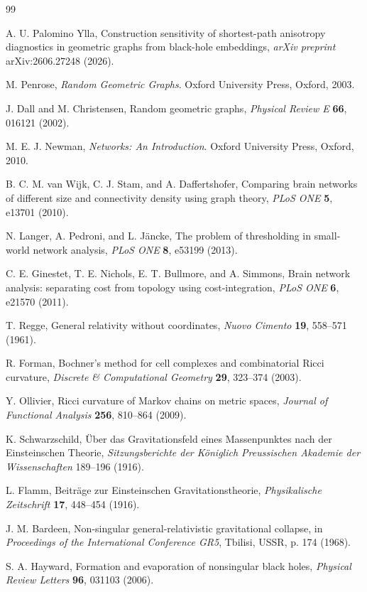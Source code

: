 \documentclass[11pt]{article}
\begin{document}
\begin{thebibliography}{99}

A. U. Palomino Ylla,
Construction sensitivity of shortest-path anisotropy diagnostics in geometric
graphs from black-hole embeddings,
\emph{arXiv preprint} arXiv:2606.27248 (2026).

M. Penrose,
\emph{Random Geometric Graphs}.
Oxford University Press, Oxford, 2003.

J. Dall and M. Christensen,
Random geometric graphs,
\emph{Physical Review E} \textbf{66}, 016121 (2002).

M. E. J. Newman,
\emph{Networks: An Introduction}.
Oxford University Press, Oxford, 2010.

B. C. M. van Wijk, C. J. Stam, and A. Daffertshofer,
Comparing brain networks of different size and connectivity density using graph
theory,
\emph{PLoS ONE} \textbf{5}, e13701 (2010).

N. Langer, A. Pedroni, and L. J{\"a}ncke,
The problem of thresholding in small-world network analysis,
\emph{PLoS ONE} \textbf{8}, e53199 (2013).

C. E. Ginestet, T. E. Nichols, E. T. Bullmore, and A. Simmons,
Brain network analysis: separating cost from topology using cost-integration,
\emph{PLoS ONE} \textbf{6}, e21570 (2011).

T. Regge,
General relativity without coordinates,
\emph{Nuovo Cimento} \textbf{19}, 558--571 (1961).

R. Forman,
Bochner's method for cell complexes and combinatorial Ricci curvature,
\emph{Discrete \& Computational Geometry} \textbf{29}, 323--374 (2003).

Y. Ollivier,
Ricci curvature of Markov chains on metric spaces,
\emph{Journal of Functional Analysis} \textbf{256}, 810--864 (2009).

K. Schwarzschild,
{\"U}ber das Gravitationsfeld eines Massenpunktes nach der Einsteinschen Theorie,
\emph{Sitzungsberichte der K{\"o}niglich Preussischen Akademie der Wissenschaften}
189--196 (1916).

L. Flamm,
Beitr{\"a}ge zur Einsteinschen Gravitationstheorie,
\emph{Physikalische Zeitschrift} \textbf{17}, 448--454 (1916).

J. M. Bardeen,
Non-singular general-relativistic gravitational collapse,
in \emph{Proceedings of the International Conference GR5}, Tbilisi, USSR, p. 174
(1968).

S. A. Hayward,
Formation and evaporation of nonsingular black holes,
\emph{Physical Review Letters} \textbf{96}, 031103 (2006).

\end{thebibliography}
\end{document}
